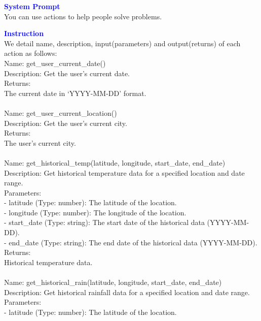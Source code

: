 \begin{tcolorbox}[breakable,title=Prompt Details for Weather]
\textbf{\textcolor{blue}{System Prompt}}\\ 
You can use actions to help people solve problems.\\
\textbf{\textcolor{blue}{Instruction}}\\
We detail name, description, input(parameters) and output(returns) of each action as follows:\\
Name: get\_user\_current\_date()\\
Description: Get the user's current date.\\
Returns:\\
The current date in `YYYY-MM-DD' format.\\
\\
Name: get\_user\_current\_location()\\
Description: Get the user's current city.\\
Returns:\\
The user's current city.\\
\\
Name: get\_historical\_temp(latitude, longitude, start\_date, end\_date)\\
Description: Get historical temperature data for a specified location and date range.\\
Parameters:\\
- latitude (Type: number): The latitude of the location.\\
- longitude (Type: number): The longitude of the location.\\
- start\_date (Type: string): The start date of the historical data (YYYY-MM-DD).\\
- end\_date (Type: string): The end date of the historical data (YYYY-MM-DD).\\
Returns:\\
Historical temperature data.\\
\\
Name: get\_historical\_rain(latitude, longitude, start\_date, end\_date)\\
Description: Get historical rainfall data for a specified location and date range.\\
Parameters:\\
- latitude (Type: number): The latitude of the location.\\

\end{tcolorbox}

